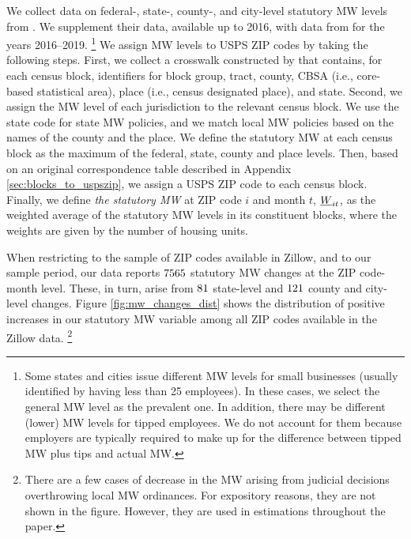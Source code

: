 We collect data on federal-, state-, county-, and city-level statutory MW levels 
from \textcite{VaghulZipperer2016}.
We supplement their data, available up to 2016, with data from 
\textcite{BerkeleyLaborCenter} for the years 2016--2019.%
\footnote{Some states and cities issue different MW levels for small businesses
(usually identified by having less than 25 employees).
In these cases, we select the general MW level as the prevalent one.
In addition, there may be different (lower) MW levels for tipped employees.
We do not account for them because employers are typically required to make up 
for the difference between tipped MW plus tips and actual MW.}
We assign MW levels to USPS ZIP codes by taking the following steps.
First, we collect a crosswalk constructed by \parencite{CensusLODES} that contains,
for each census block, identifiers for block group, tract, county, CBSA 
(i.e., core-based statistical area), place (i.e., census designated place), and state.
Second, we assign the MW level of each jurisdiction to the relevant census block.
We use the state code for state MW policies, and we match local MW policies 
based on the names of the county and the place.
We define the statutory MW at each census block as the maximum of the federal,
state, county and place levels.
Then, based on an original correspondence table described in Appendix 
\ref{sec:blocks_to_uspszip}, we assign a USPS ZIP code to each census
block.
Finally, we define \textit{the statutory MW} at ZIP code $i$ and month $t$, $\underline{W}_{it}$, 
as the weighted average of the statutory MW levels in its constituent blocks, 
where the weights are given by the number of housing units.

When restricting 
to the sample of ZIP codes available in Zillow, and 
to our sample period, our data reports 
$\textnormal{7565}$ statutory MW changes at the ZIP code-month level.
These, in turn, arise from 
$\textnormal{81}$ state-level and 
$\textnormal{121}$ county and city-level changes.
Figure \ref{fig:mw_changes_dist} shows the distribution of positive increases in
our statutory MW variable among all ZIP codes available in the Zillow data.%
\footnote{There are a few cases of decrease in the MW arising from judicial 
decisions overthrowing local MW ordinances.
For expository reasons, they are not shown in the figure.
However, they are used in estimations throughout the paper.}

